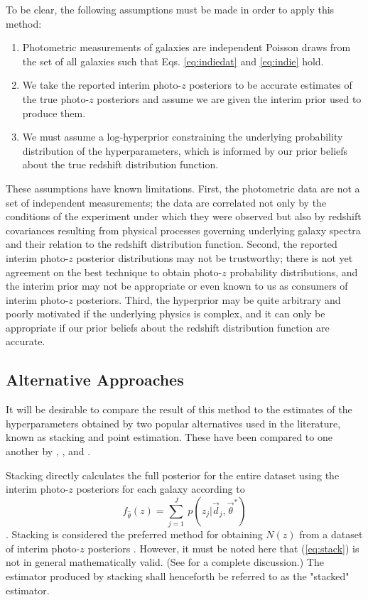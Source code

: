 \documentclass[preprint]{aastex}
\begin{document}
To be clear, the following assumptions must be made in order to apply this 
method:

\begin{enumerate}
\item Photometric measurements of galaxies are independent Poisson draws from 
the set of all galaxies such that Eqs. \ref{eq:indiedat} and \ref{eq:indie} 
hold.
\item We take the reported interim photo-$z$ posteriors to be accurate 
estimates of the true photo-$z$ posteriors and assume we are given the interim 
prior used to produce them.
\item We must assume a log-hyperprior constraining the underlying probability 
distribution of the hyperparameters, which is informed by our prior beliefs 
about the true redshift distribution function.
\end{enumerate}

These assumptions have known limitations.  First, the photometric data are not 
a set of independent measurements; the data are correlated not only by the 
conditions of the experiment under which they were observed but also by 
redshift covariances resulting from physical processes governing underlying 
galaxy spectra and their relation to the redshift distribution function.  
Second, the reported interim photo-$z$ posterior distributions may not be 
trustworthy; there is not yet agreement on the best technique to obtain 
photo-$z$ probability distributions, and the interim prior may not be 
appropriate or even known to us as consumers of interim photo-$z$ posteriors.  
Third, the hyperprior may be quite arbitrary and poorly motivated if the 
underlying physics is complex, and it can only be appropriate if our prior 
beliefs about the redshift distribution function are accurate.

\subsection{Alternative Approaches}
\label{sec:sheldon}

It will be desirable to compare the result of this method to the estimates of 
the hyperparameters obtained by two popular alternatives used in the 
literature, known as stacking and point estimation.   These have been compared 
to one another by \citet{Hildebrandt2012}, \citet{Benjamin2013}, and 
\citet{Asorey2016}.

Stacking directly calculates the full posterior for the entire dataset using 
the interim photo-$z$ posteriors for each galaxy according to 
\begin{equation}
\label{eq:stack}
f_{\hat{\theta}}(z) = \sum_{j=1}^{J}\ p(z_{j}|\vec{d}_{j},\vec{\theta}^{*})
\end{equation}
\citep{Lima2008}.  Stacking is considered the preferred method for obtaining 
$N(z)$ from a dataset of interim photo-$z$ posteriors \citep{Sheldon2012, 
Kelly2014, Benjamin2013, Bonnett2015a, Viironen2015, Asorey2016}.  However, it 
must be noted here that (\ref{eq:stack}) is not in general mathematically 
valid.  (See \citet{Hogg2012} for a complete discussion.)  The estimator 
produced by stacking shall henceforth be referred to as the "stacked" estimator.
\end{document}
